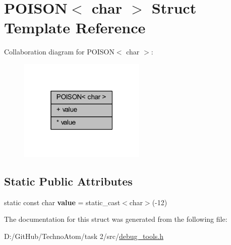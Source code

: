 \hypertarget{struct_p_o_i_s_o_n_3_01char_01_4}{}\section{P\+O\+I\+S\+ON$<$ char $>$ Struct Template Reference}
\label{struct_p_o_i_s_o_n_3_01char_01_4}


Collaboration diagram for P\+O\+I\+S\+ON$<$ char $>$\+:
\nopagebreak
\begin{figure}[H]
\begin{center}
\leavevmode
\includegraphics[width=171pt]{struct_p_o_i_s_o_n_3_01char_01_4__coll__graph}
\end{center}
\end{figure}
\subsection*{Static Public Attributes}
\textbf{ }\par
\begin{DoxyCompactItemize}
\item 
\mbox{\label{struct_p_o_i_s_o_n_3_01char_01_4_aa67110240ea4d4906071479b36c3f7e3}} 
static const char {\bfseries value} = static\+\_\+cast$<$char$>$(-\/12)
\end{DoxyCompactItemize}



The documentation for this struct was generated from the following file\+:\begin{DoxyCompactItemize}
\item 
D\+:/\+Git\+Hub/\+Techno\+Atom/task 2/src/\hyperlink{debug__tools_8h}{debug\+\_\+tools.\+h}\end{DoxyCompactItemize}
